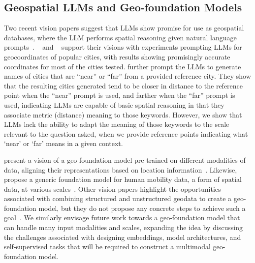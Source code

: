 \subsection{Geospatial LLMs and Geo-foundation Models}
Two recent vision papers suggest that LLMs show promise for use as geospatial databases, where the LLM performs spatial reasoning given natural language prompts~\cite{Bhandari2023, Qi2023}.
\citeauthor{Bhandari2023}~\cite{Bhandari2023} and \citeauthor{Qi2023}~\cite{Qi2023} support their visions with experiments prompting LLMs for geocoordinates of popular cities, with results showing promisingly accurate coordinates for most of the cities tested.
\citeauthor{Bhandari2023} further prompt the LLMs to generate names of cities that are ``near'' or ``far'' from a provided reference city.
They show that the resulting cities generated tend to be closer in distance to the reference point when the ``near'' prompt is used, and farther when the ``far'' prompt is used, indicating LLMs are capable of basic spatial reasoning in that they associate metric (distance) meaning to those keywords.
However, we show that LLMs lack the ability to adapt the meaning of those keywords to the scale relevant to the question asked, when we provide reference points indicating what `near' or `far' means in a given context.

\citeauthor{Mai2023} present a vision of a geo foundation model pre-trained on different modalities of data, aligning their representations based on location information~\cite{Mai2023}.
Likewise, \citeauthor{Fei2022} propose a generic foundation model for human mobility data, a form of spatial data, at various scales~\cite{Fei2022}.
Other vision papers highlight the opportunities associated with combining structured and unstructured geodata to create a geo-foundation model, but they do not propose any concrete steps to achieve such a goal~\cite{Xie2023, Tan2023}.
%
We similarly envisage future work towards a geo-foundation model that can handle many input modalities and scales, expanding the idea by discussing the challenges associated with designing embeddings, model architectures, and self-supervised tasks that will be required to construct a multimodal geo-foundation model.




